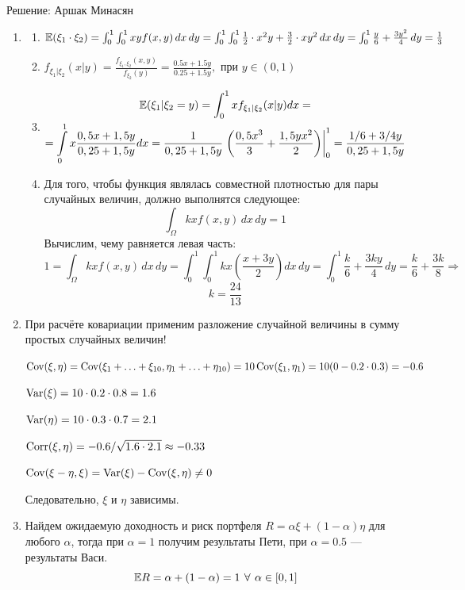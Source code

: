 Решение: Аршак Минасян


\begin{enumerate}

\item
\begin{enumerate}
\item $ \mathbb{E}({\xi_1 \cdot \xi_2}) = \int_{0}^1 \int_0^1 xy f(x,y) \, dx \, dy = \int_0^1 \int_0^1 \frac{1}{2}\cdot x^2y + \frac{3}{2}\cdot xy^2 \, dx \, dy = \int_{0}^1 \frac{y}{6} + \frac{3y^2}{4} \,dy = \frac{1}{3}$
\item $f_{\xi_1 | \xi_2} (x | y) = \frac{f_{\xi_1, \xi_2}(x, y)}{f_{\xi_2}(y)} = \frac{0.5x + 1.5y}{0.25 + 1.5y}, \text{ при } y \in (0,1)$
\item
\begin{multline*}
\mathbb{E}(\xi_1 | \xi_2 = y) = \int_0^1 x f_{\xi_1 | \xi_2} (x | y) dx = \\
= \int\limits_{0}^{1}  x \frac{0,5x + 1,5y}{0,25 + 1,5y} dx = \frac{1}{0,25 + 1,5y}  \left. \left( \dfrac{0,5x^3}{3} +  \dfrac{1,5yx^2}{2} \right) \right|_0^1  =  \frac{1/6 + 3/4y}{0,25 + 1,5y}
\end{multline*}
\item
Для того, чтобы функция являлась совместной плотностью для пары случайных величин, должно выполнятся следующее:
\[
\int_{\Omega} kx f(x,y) \, dx \, dy = 1
\]
Вычислим, чему равняется левая часть:
\[
1 = \int_{\Omega} kx f(x,y) \, dx \, dy = \int_{0}^1 \int_{0}^1 kx \left(\frac{x + 3y}{2}\right) dx \, dy = \int_{0}^1 \frac{k}{6} + \frac{3ky}{4} \, dy = \frac{k}{6} + \frac{3k}{8} \Rightarrow
\]
\[
k = \frac{24}{13}
\]
\end{enumerate}
\item При расчёте ковариации применим разложение случайной величины в сумму простых случайных величин!

$\operatorname{Cov}(\xi, \eta) = \operatorname{Cov}(\xi_1 + \ldots + \xi_{10}, \eta_1 + \ldots + \eta_{10})=10\operatorname{Cov}(\xi_1, \eta_1)=10(0-0.2\cdot 0.3)=-0.6$

$\operatorname{Var}(\xi)=10\cdot 0.2\cdot 0.8=1.6 $

$\operatorname{Var}(\eta)=10\cdot 0.3\cdot 0.7=2.1 $

$\operatorname{Corr}(\xi,\eta)=-0.6/\sqrt{1.6\cdot 2.1} \approx -0.33 $

$\operatorname{Cov}(\xi - \eta, \xi) = \operatorname{Var}(\xi) - \operatorname{Cov}(\xi, \eta) \neq 0$

Следовательно, $\xi$ и $\eta$ зависимы.

\item Найдем ожидаемую доходность и риск портфеля $R = \alpha \xi + (1-\alpha) \eta$ для любого $\alpha$, тогда при $\alpha = 1$ получим результаты Пети, при $\alpha = 0.5$ — результаты Васи.
\[
\mathbb{E} R = \alpha + (1-\alpha) = 1 \: \, \forall \, \: \alpha \in [0,1]
\]


\end{enumerate}
